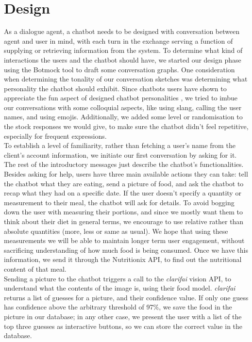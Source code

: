 \section{Design}
As a dialogue agent, a chatbot needs to be designed with conversation between agent and user in mind, with each turn in the exchange serving a function of supplying or retrieving information from the system.
To determine what kind of interactions the users and the chatbot should have, we started our design phase using the Botmock tool to draft some conversation graphs.
One consideration when determining the tonality of our conversation sketches was determining what personality the chatbot should exhibit. Since chatbots users have shown to appreciate the fun aspect of designed chatbot personalities \cite{10.1007/978-3-319-67744-6_28}, we tried to imbue our conversations with some colloquial aspects, like using slang, calling the user names, and using emojis. Additionally, we added some level or randomisation to the stock responses we would give, to make sure the chatbot didn't feel repetitive, especially for frequent expressions. \\
To establish a level of familiarity, rather than fetching a user's name from the client's account information, we initiate our first conversation by asking for it. The rest of the introductory messages just describe the chatbot's functionalities.
Besides asking for help, users have three main available actions they can take: tell the chatbot what they are eating, send a picture of food, and ask the chatbot to recap what they had on a specific date. If the user doesn't specify a quantity or measurement to their meal, the chatbot will ask for details. To avoid bogging down the user with measuring their portions, and since we mostly want them to think about their diet in general terms, we encourage to use relative rather than absolute quantities (more, less or same as usual). We hope that using these measurements we will be able to maintain longer term user engagement, without sacrificing understanding of how much food is being consumed. Once we have this information, we send it through the Nutritionix API, to find out the nutritional content of that meal. \\
Sending a picture to the chatbot triggers a call to the \textit{clarifai} vision API, to understand what the contents of the image is, using their food model. \textit{clarifai} returns a list of guesses for a picture, and their confidence value. If only one guess has confidence above the arbitrary threshold of 97\%, we save the food in the picture in our database; in any other case, we present the user with a list of the top three guesses as interactive buttons, so we can store the correct value in the database. \\
